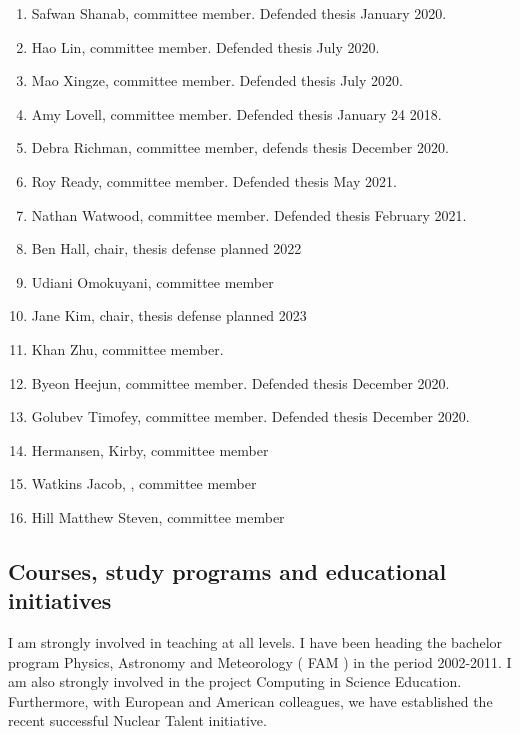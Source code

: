 \documentclass[%
oneside,                 %
final,                   %
10pt]{article}
\begin{document}
\begin{enumerate}
\item Safwan Shanab, committee member. Defended thesis January 2020.

\item Hao Lin, committee member. Defended thesis July 2020.

\item Mao Xingze, committee member. Defended thesis July 2020.

\item Amy Lovell, committee member. Defended thesis January 24 2018.

\item Debra Richman, committee member, defends thesis December 2020.

\item Roy Ready, committee member. Defended thesis May 2021.

\item Nathan Watwood, committee member. Defended thesis February 2021. 

\item Ben Hall, chair, thesis defense planned 2022

\item Udiani Omokuyani, committee member

\item Jane Kim, chair, thesis defense planned 2023

\item Khan Zhu, committee member. 

\item Byeon Heejun, committee member. Defended thesis December 2020.

\item Golubev Timofey, committee member. Defended thesis December 2020.

\item Hermansen, Kirby, committee member

\item Watkins Jacob, , committee member

\item Hill Matthew Steven, committee member
\end{enumerate}

\noindent
\subsection*{Courses, study programs and educational initiatives}

I am strongly involved in teaching at all levels. I have been heading
the bachelor program Physics, Astronomy and Meteorology ( FAM ) in the
period 2002-2011. I am also strongly involved in the project Computing
in Science Education. Furthermore, with European and American
colleagues, we have established the recent successful Nuclear Talent
initiative.
\end{document}
